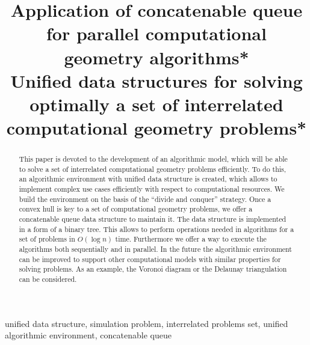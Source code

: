 \documentclass[conference]{IEEEtran}
\begin{document}
\title{Application of concatenable queue for parallel computational geometry algorithms*\\}

\title{Unified data structures for solving optimally a set of interrelated computational geometry problems*}
\author{
	\and
}

\maketitle

\begin{abstract}
	This paper is devoted to the development of an algorithmic model, which will be able to solve a set of interrelated computational geometry problems efficiently. To do this, an algorithmic environment with unified data structure is created, which allows to implement complex use cases efficiently with respect to computational resources. We build the environment on the basis of the ``divide and conquer'' strategy. 
	Once a convex hull is key to a set of computational geometry problems, we offer a concatenable queue data structure to maintain it. The data structure is implemented in a form of a binary tree. This allows to perform operations needed in algorithms for a set of problems in $O(\log n)$ time. Furthermore we offer a way to execute the algorithms both sequentially and in parallel.
	In the future the algorithmic environment can be improved to support other computational models with similar properties for solving problems. As an example, the Voronoi diagram or the Delaunay triangulation can be considered.
\end{abstract}

\begin{IEEEkeywords}
unified data structure, simulation problem, interrelated problems set, unified algorithmic environment, concatenable queue
\end{IEEEkeywords}
\end{document}
